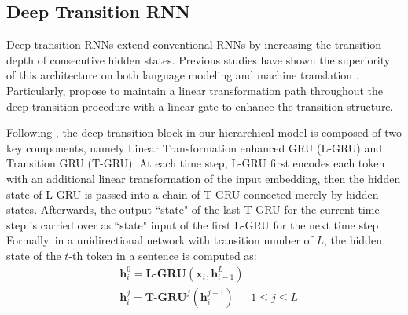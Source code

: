 \documentclass[11pt,a4paper]{article}
\begin{document}
\subsection{Deep Transition RNN}
Deep transition RNNs extend conventional RNNs by increasing the transition depth of consecutive hidden states. Previous studies have shown the superiority of this architecture on both language modeling \cite{DT_language_model} and machine translation \cite{DT_machine_translation,DTMT}. Particularly, \citeauthor{DTMT}  propose to maintain a linear transformation path throughout the deep transition procedure with a linear gate to enhance the transition structure.

Following \citeauthor{DTMT} , the deep transition block in our hierarchical model is composed of two key components, namely Linear Transformation enhanced GRU (L-GRU) and Transition GRU (T-GRU). At each time step, L-GRU first encodes each token with an additional linear transformation of the input embedding, then the hidden state of L-GRU is passed into a chain of T-GRU connected merely by hidden states. Afterwards, the output ``state" of the last T-GRU for the current time step is carried over as ``state" input of the first L-GRU for the next time step. Formally, in a unidirectional network with transition number of $L$, the hidden state of the $t$-th token in a sentence is computed as:
\begin{align}
& \mathbf{h}_{i}^0 = \mathbf{L}\textrm{-}\mathbf{GRU}(\mathbf{x}_i, \mathbf{h}_{i-1}^L)  \\
& \mathbf{h}_{i}^j = \mathbf{T}\textrm{-}\mathbf{GRU}^{j}( \mathbf{h}_{i}^{j-1})  \ \ \ \ \ \ \   1 \leq j \leq L  
\end{align}
\end{document}
